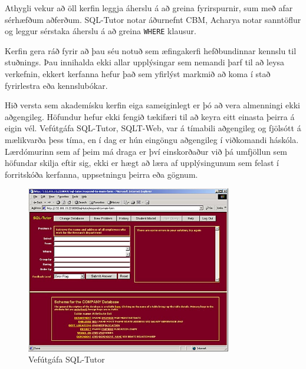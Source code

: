 \documentclass[a4paper,12pt,twoside,BCOR=10mm]{scrbook}
\begin{document}
Athygli vekur að öll kerfin leggja áherslu á að greina fyrirspurnir, sum með afar sérhæfðum aðferðum. SQL-Tutor notar áðurnefnt CBM, Acharya notar sanntöflur og leggur sérstaka áherslu á að greina \texttt{WHERE} klausur.

Kerfin gera ráð fyrir að þau séu notuð sem æfingakerfi hefðbundinnar kennslu til stuðnings. Þau innihalda ekki allar upplýsingar sem nemandi þarf til að leysa verkefnin, ekkert kerfanna hefur það sem yfirlýst markmið að koma í stað fyrirlestra eða kennslubókar. 

Hið versta sem akademísku kerfin eiga sameiginlegt er þó að vera almenningi ekki aðgengileg. Höfundur hefur ekki fengið tækifæri til að keyra eitt einasta þeirra á eigin vél. Vefútgáfa SQL-Tutor, SQLT-Web, var á tímabili aðgengileg og fjölsótt á mælikvarða þess tíma\cite{mitrovic2003intelligent}, en í dag er hún eingöngu aðgengileg í viðkomandi háskóla. Lærdómurinn sem af þeim má draga er því einskorðaður við þá umfjöllun sem höfundar skilja eftir sig, ekki er hægt að læra af upplýsingunum sem felast í forritskóða kerfanna, uppsetningu þeirra eða gögnum.

\begin{figure}
\caption{Vefútgáfa SQL-Tutor\cite{mitrovic2016sqltutorweb}}
\label{fig:sqltutorweb}
\begin{center}
\includegraphics[width=0.8\textwidth]{sqlt-web}
\end{center}
\end{figure}
\end{document}
